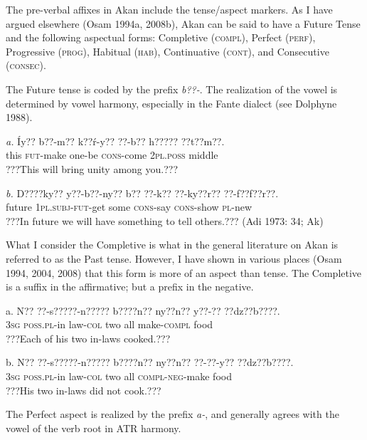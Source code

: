 \documentclass[output=paper]{langsci/langscibook}
\begin{document}
The pre-verbal affixes in Akan include the tense/aspect markers. As I have argued elsewhere (Osam 1994a, 2008b), Akan can be said to have a Future Tense and the following aspectual forms: Completive (\textsc{compl}), Perfect (\textsc{perf}), Progressive (\textsc{prog}), Habitual (\textsc{hab}), Continuative (\textsc{cont}), and Consecutive (\textsc{consec}).

The Future tense is coded by the prefix \emph{b??-}. The realization of the vowel is determined by vowel harmony, especially in the Fante dialect (see Dolphyne 1988).

\ea
\gll \emph{a.}  \'{I}y??  b??-m??    k??\'{r}-y??    ??-b??    h?????    ??t??m??.\\
       this  \textsc{fut}{}-make  one-be    \textsc{cons}{}-come  \textsc{2pl.poss}  middle\\
\glt ???This will bring unity among you.??? \citep[79]{Krampah1970}
\z

\ea
\gll \emph{b.  }D????ky?? y??-b??-ny??    b??  ??-k??    ??-ky??r??    ??-f??f??r??.  \\
       future   \textsc{1pl.subj}{}-\textsc{fut}{}-get  some  \textsc{cons}{}-say\textsc{   cons}{}-show  \textsc{pl}{}-new\\
\glt    ???In future we will have something to tell others.??? (Adi 1973: 34; Ak)
\z

What I consider the Completive is what in the general literature on Akan is referred to as the Past tense. However, I have shown in various places (Osam 1994, 2004, 2008) that this form is more of an aspect than tense. The Completive is a suffix in the affirmative; but a prefix in the negative.  

\ea
\gll \textup{a.}  N??  ??-s?????-n?????    b????n??   ny??n??  y??-??    ??dz??b????.\\
     \textsc{ }\textsc{\textup{3sg}}   \textsc{poss.pl}{}-in law-\textsc{col}  two   all  make-\textsc{compl}  food\\
\glt ???Each of his two in-laws cooked.??? \citep[57]{Krampah1970}
\z

\ea
\gll \textup{b.  }N??  ??-s?????-n?????    b????n??   ny??n??  ??-??-y??      ??dz??b????.\\
     \textsc{  3sg}   \textsc{poss.pl}{}-in law-\textsc{col}  two  all  \textsc{compl-neg}{}-make  food\\
\glt ???His two in-laws did not cook.???
\z

The Perfect aspect is realized by the prefix \emph{a-}, and generally agrees with the vowel of the verb root in ATR harmony.
\end{document}
